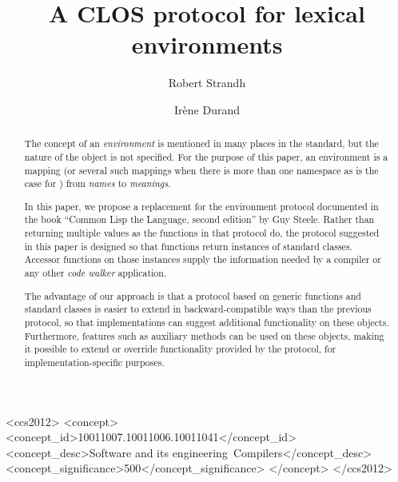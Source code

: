 \documentclass[format=sigconf]{acmart}
\def\inputtex#1{}
\begin{document}
\title{A CLOS protocol for lexical environments}

\author{Robert Strandh}

\author{Irène Durand
}

\begin{abstract}
The concept of an \emph{environment} is mentioned in many places in
the \commonlisp{} standard, but the nature of the object is not
specified.  For the purpose of this paper, an environment is a mapping
(or several such mappings when there is more than one namespace as is
the case for \commonlisp{}) from \emph{names} to \emph{meanings}.

In this paper, we propose a replacement for the environment protocol
documented in the book ``Common Lisp the Language, second edition'' by
Guy Steele.  Rather than returning multiple values as the functions in
that protocol do, the protocol suggested in this paper is designed so
that functions return instances of standard classes.  Accessor
functions on those instances supply the information needed by a
compiler or any other \emph{code walker} application.

The advantage of our approach is that a protocol based on generic
functions and standard classes is easier to extend in
backward-compatible ways than the previous protocol, so that
implementations can suggest additional functionality on these objects.
Furthermore, \clos{} features such as auxiliary methods can be used on
these objects, making it possible to extend or override functionality
provided by the protocol, for implementation-specific purposes.
\end{abstract}

\begin{CCSXML}
<ccs2012>
<concept>
<concept_id>10011007.10011006.10011041</concept_id>
<concept_desc>Software and its engineering~Compilers</concept_desc>
<concept_significance>500</concept_significance>
</concept>
</ccs2012>
\end{CCSXML}



\maketitle

\inputtex{spec-macros.tex}

\inputtex{sec-introduction.tex}
\inputtex{sec-previous.tex}
\inputtex{sec-our-method.tex}
\inputtex{sec-benefits.tex}
\inputtex{sec-disadvantages.tex}
\inputtex{sec-conclusions.tex}
\inputtex{sec-acknowledgements.tex}



\end{document}
